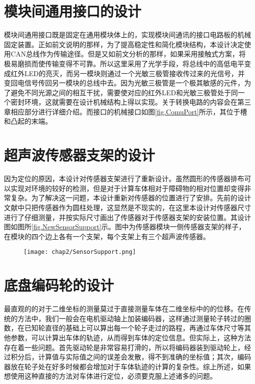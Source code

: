 \section{模块间通用接口的设计}
模块间通用接口既是固定在通用模块体上的，实现模块间通讯的接口电路板的机械固定装置。正如前文说明的那样，为了提高稳定性和简化模块结构，本设计决定使用CAN总线作为传输途径。但是又如前文分析的那样，如果采用接触式方案，将极易磨损而使传输变得不可靠。所以这里采用了光学手段，将总线中的高低电平变成红外LED的亮灭，而另一模块则通过一个光敏三极管接收传过来的光信号，并变回电信号传回另一模块的总线中去。因为光敏三极管是一个极其敏感的元件，为了避免不同光源之间的相互干扰，需要使对应的红外LED和光敏三极管处于同一个密封环境，这就需要在设计机械结构上得以实现。关于转换电路的内容会在第三章相应部分进行详细介绍。而接口的机械接口如图\ref{fig.ComuPort}所示，其位于槽和凸起的末端。
\begin{figure}
  \centering
\end{figure}
\section{超声波传感器支架的设计}
因为定位的原因，本设计对传感器支架进行了重新设计。虽然圆形的传感器排布可以实现对环境的较好的检测，但是对于计算车体相对于障碍物的相对位置却变得非常复杂。为了解决这一问题，本设计重新对传感器的位置进行了安排。先前的设计文献中只把传感器作为圆柱处理，这显然是不现实的，在这里本设计对传感器尺寸进行了仔细测量，并按实际尺寸画出了传感器对于传感器支架的安装位置。其设计图如图所\ref{fig.NewSensorSupport}示。图中为传感器模块一侧传感器支架的样子，在模块的四个边上各有一个支架，每个支架上有三个超声波传感器。
\begin{figure}[!htp]
  \centering
  \texttt{[image: chap2/SensorSupport.png]}
\end{figure}
\section{底盘编码轮的设计}
最直观的的对于二维坐标的测量莫过于直接测量车体在二维坐标中的的位移。在传统的方法中，我们一般会在电机驱动轴上加装编码器，这样通过测量轮子转过的圈数，在已知轮直径的基础上可以算出每一个轮子走过的路程，再通过车体尺寸等其他参数，可以计算出车体的轨迹，从而得到车体的定位信息。但实际上，这种方法存在着一些问题。首先驱动轮是非常容易打滑的，所以将编码器装到驱动轮上，经过积分后，计算值与实际值之间的误差会发散，得不到准确的坐标值；其次，编码器放在轮子处在好多时候都会增加对于车体轨迹的计算的复杂性。综上所述，如果想使用这种直接的方法对车体进行定位，必须要克服上述诸多的问题。

